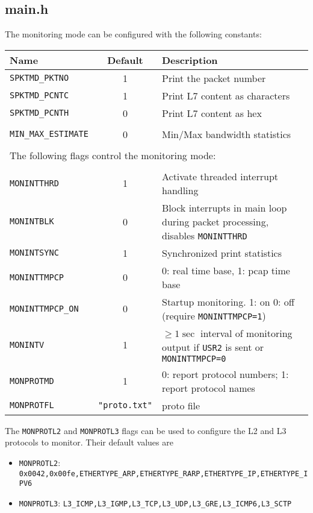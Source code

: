 \subsection{main.h}\label{main.h}
The monitoring mode can be configured with the following constants:\\
\begin{center}
    \begin{tabularx}{\textwidth}{lcX}
        \toprule
        {\bf Name} & {\bf Default} & {\bf Description}\\
        \midrule
        {\tt SPKTMD\_PKTNO} & 1 & Print the packet number\\
        {\tt SPKTMD\_PCNTC} & 1 & Print L7 content as characters\\
        {\tt SPKTMD\_PCNTH} & 0 & Print L7 content as hex\\\\

        {\tt MIN\_MAX\_ESTIMATE} & 0 & Min/Max bandwidth statistics\\\\

        \multicolumn{3}{l}{The following flags control the monitoring mode:}\\\\

        {\tt MONINTTHRD}      & 1   & Activate threaded interrupt handling \\
        {\tt MONINTBLK}       & 0   & Block interrupts in main loop during packet processing, disables {\tt MONINTTHRD} \\
        {\tt MONINTSYNC}      & 1   & Synchronized print statistics \\
        {\tt MONINTTMPCP}     & 0   & 0: real time base, 1: pcap time base \\
        {\tt MONINTTMPCP\_ON} & 0   & Startup monitoring. 1: on 0: off (require {\tt MONINTTMPCP=1})\\
        {\tt MONINTV}         & 1   & $\geq 1\sec$ interval of monitoring output if {\tt USR2} is sent or {\tt MONINTTMPCP=0}\\
        {\tt MONPROTMD}       & 1   & 0: report protocol numbers; 1: report protocol names \\
        {\tt MONPROTFL} & {\small\tt "proto.txt"} & proto file \\
        \bottomrule
    \end{tabularx}
\end{center}

The {\tt MONPROTL2} and {\tt MONPROTL3} flags can be used to configure the L2 and L3 protocols to monitor.
Their default values are
\begin{itemize}
    \item {\tt MONPROTL2}: {\tt 0x0042,0x00fe,ETHERTYPE\_ARP,ETHERTYPE\_RARP,ETHERTYPE\_IP,ETHERTYPE\_IPV6}
    \item {\tt MONPROTL3}: {\tt L3\_ICMP,L3\_IGMP,L3\_TCP,L3\_UDP,L3\_GRE,L3\_ICMP6,L3\_SCTP}
\end{itemize}

